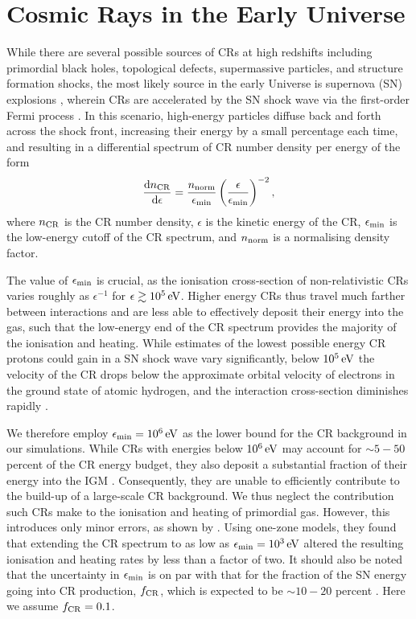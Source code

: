 \documentclass[usenatbib]{mn2e}
\newcommand{\ev}{\,{\rm eV}}
\begin{document}
\section{Cosmic Rays in the Early Universe}
\label{sec:context}
While there are several possible sources of CRs at high redshifts including primordial black holes, topological defects, supermassive particles, and structure formation shocks, the most likely source in the early Universe is supernova (SN) explosions \citep[e.g.,][]{GinzburgSyrovatskii1969,BiermannSigl2001,Stanev2004,Pfrommeretal2006}, wherein CRs are accelerated by the SN shock wave via the first-order Fermi process \citep[e.g.,][]{Bell1978}.  
In this scenario, high-energy particles diffuse back and forth across the shock front, increasing their energy by a small percentage each time, and resulting in a differential spectrum of CR number density per energy \citep{Longair1994} of the form
\begin{equation}
    \frac{{\rm d}n_{\rm \small CR}}{{\rm d}\epsilon} = \frac{n_{\rm norm}}{\epsilon_{\rm min}}
    \left( \frac{\epsilon}{\epsilon_{\rm min}} \right)^{-2},
\end{equation}
where $n_{\rm \small CR}$ is the CR number density, $\epsilon$ is the kinetic energy of the CR, $\epsilon_{\rm min}$ is the low-energy cutoff of the CR spectrum, and $n_{\rm norm}$ is a normalising density factor. 

The value of $\epsilon_{\rm min}$ is crucial, as the ionisation cross-section of non-relativistic CRs varies roughly as $\epsilon^{-1}$ for $\epsilon \gtrsim 10^5\ev$. 
Higher energy CRs thus travel much farther between interactions and are less able to effectively deposit their energy into the gas, such that the low-energy end of the CR spectrum provides the majority of the ionisation and heating.  
While estimates of the lowest possible energy CR protons could gain in a SN shock wave vary significantly, below $10^5\ev$ the velocity of the CR drops below the approximate orbital velocity of electrons in the ground state of atomic hydrogen, and the interaction cross-section diminishes rapidly \citep{Schlickeiser2002}. 

We therefore employ $\epsilon_{\rm min} = 10^6\ev$ as the lower bound for the CR background in our simulations.  
While CRs with energies below $10^6\ev$ may account for $\sim$$5-50$ percent of the CR energy budget, they also deposit a substantial fraction of their energy into the IGM \citep{SazonovSunyaev2015}. 
Consequently, they are unable to efficiently contribute to the build-up of a large-scale CR background. We thus neglect the contribution such CRs make to the ionisation and heating of primordial gas. 
However, this introduces only minor errors, as shown by \citet{StacyBromm2007}. Using one-zone models, they found that extending the CR spectrum to as low as $\epsilon_{\rm min} = 10^3\ev$ altered the resulting ionisation and heating rates by less than a factor of two.  
It should also be noted that the uncertainty in $\epsilon_{\rm min}$ is on par with that for the fraction of the SN energy going into CR production, $f_{\rm \small CR}$, which is expected to be $\sim$$10-20$ percent \citep{CaprioliSpitkovsky2014}.  
Here we assume $f_{\rm \small CR} = 0.1$.
\end{document}
